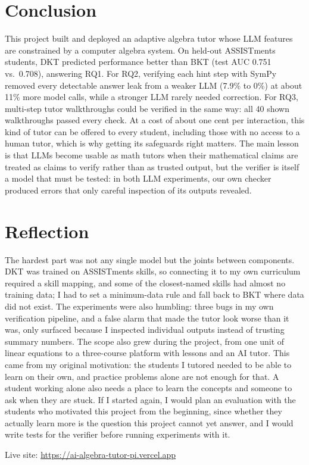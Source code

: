 \documentclass[11pt]{article}
\begin{document}
\section{Conclusion}
This project built and deployed an adaptive algebra tutor whose LLM features are constrained by a computer algebra system. On held-out ASSISTments students, DKT predicted performance better than BKT (test AUC 0.751 vs.\ 0.708), answering RQ1. For RQ2, verifying each hint step with SymPy removed every detectable answer leak from a weaker LLM (7.9\% to 0\%) at about 11\% more model calls, while a stronger LLM rarely needed correction. For RQ3, multi-step tutor walkthroughs could be verified in the same way: all 40 shown walkthroughs passed every check. At a cost of about one cent per interaction, this kind of tutor can be offered to every student, including those with no access to a human tutor, which is why getting its safeguards right matters. The main lesson is that LLMs become usable as math tutors when their mathematical claims are treated as claims to verify rather than as trusted output, but the verifier is itself a model that must be tested: in both LLM experiments, our own checker produced errors that only careful inspection of its outputs revealed.

\section*{Reflection}
The hardest part was not any single model but the joints between components. DKT was trained on ASSISTments skills, so connecting it to my own curriculum required a skill mapping, and some of the closest-named skills had almost no training data; I had to set a minimum-data rule and fall back to BKT where data did not exist. The experiments were also humbling: three bugs in my own verification pipeline, and a false alarm that made the tutor look worse than it was, only surfaced because I inspected individual outputs instead of trusting summary numbers. The scope also grew during the project, from one unit of linear equations to a three-course platform with lessons and an AI tutor. This came from my original motivation: the students I tutored needed to be able to learn on their own, and practice problems alone are not enough for that. A student working alone also needs a place to learn the concepts and someone to ask when they are stuck. If I started again, I would plan an evaluation with the students who motivated this project from the beginning, since whether they actually learn more is the question this project cannot yet answer, and I would write tests for the verifier before running experiments with it.

\medskip
\noindent\small Live site: \url{https://ai-algebra-tutor-pi.vercel.app}



\end{document}

